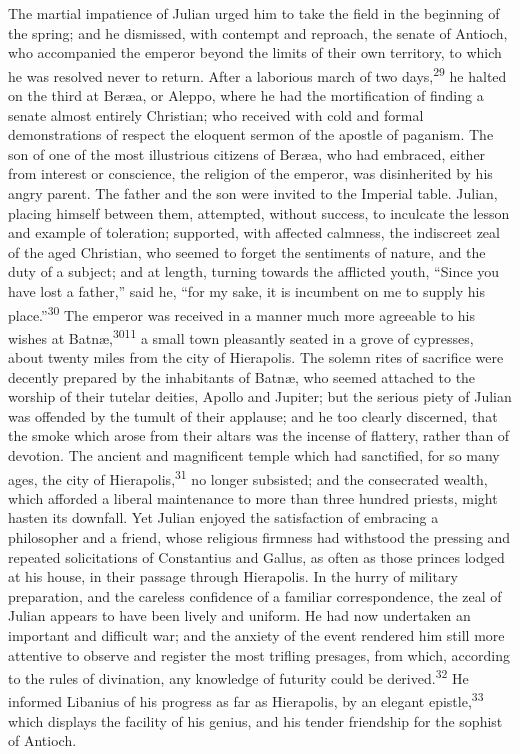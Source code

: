 The martial impatience of Julian urged him to take the field in
the beginning of the spring; and he dismissed, with contempt and
reproach, the senate of Antioch, who accompanied the emperor
beyond the limits of their own territory, to which he was
resolved never to return. After a laborious march of two days,\textsuperscript{29}
he halted on the third at Beræa, or Aleppo, where he had the
mortification of finding a senate almost entirely Christian; who
received with cold and formal demonstrations of respect the
eloquent sermon of the apostle of paganism. The son of one of the
most illustrious citizens of Beræa, who had embraced, either from
interest or conscience, the religion of the emperor, was
disinherited by his angry parent. The father and the son were
invited to the Imperial table. Julian, placing himself between
them, attempted, without success, to inculcate the lesson and
example of toleration; supported, with affected calmness, the
indiscreet zeal of the aged Christian, who seemed to forget the
sentiments of nature, and the duty of a subject; and at length,
turning towards the afflicted youth, “Since you have lost a
father,” said he, “for my sake, it is incumbent on me to supply
his place.”\textsuperscript{30} The emperor was received in a manner much more
agreeable to his wishes at Batnæ,\textsuperscript{3011} a small town pleasantly
seated in a grove of cypresses, about twenty miles from the city
of Hierapolis. The solemn rites of sacrifice were decently
prepared by the inhabitants of Batnæ, who seemed attached to the
worship of their tutelar deities, Apollo and Jupiter; but the
serious piety of Julian was offended by the tumult of their
applause; and he too clearly discerned, that the smoke which
arose from their altars was the incense of flattery, rather than
of devotion. The ancient and magnificent temple which had
sanctified, for so many ages, the city of Hierapolis,\textsuperscript{31} no
longer subsisted; and the consecrated wealth, which afforded a
liberal maintenance to more than three hundred priests, might
hasten its downfall. Yet Julian enjoyed the satisfaction of
embracing a philosopher and a friend, whose religious firmness
had withstood the pressing and repeated solicitations of
Constantius and Gallus, as often as those princes lodged at his
house, in their passage through Hierapolis. In the hurry of
military preparation, and the careless confidence of a familiar
correspondence, the zeal of Julian appears to have been lively
and uniform. He had now undertaken an important and difficult
war; and the anxiety of the event rendered him still more
attentive to observe and register the most trifling presages,
from which, according to the rules of divination, any knowledge
of futurity could be derived.\textsuperscript{32} He informed Libanius of his
progress as far as Hierapolis, by an elegant epistle,\textsuperscript{33} which
displays the facility of his genius, and his tender friendship
for the sophist of Antioch.

